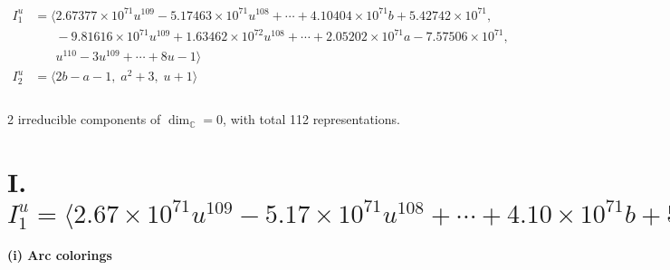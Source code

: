 \documentclass[1p]{elsarticle_modified}
\theoremstyle{definition}
\begin{document}
\begin{align*}
I^u_{1}&=\langle 
2.67377\times10^{71} u^{109}-5.17463\times10^{71} u^{108}+\cdots+4.10404\times10^{71} b+5.42742\times10^{71},\\
\phantom{I^u_{1}}&\phantom{= \langle  }-9.81616\times10^{71} u^{109}+1.63462\times10^{72} u^{108}+\cdots+2.05202\times10^{71} a-7.57506\times10^{71},\\
\phantom{I^u_{1}}&\phantom{= \langle  }u^{110}-3 u^{109}+\cdots+8 u-1\rangle \\
I^u_{2}&=\langle 
2 b- a-1,\;a^2+3,\;u+1\rangle \\
\\
\end{align*}
\raggedright * 2 irreducible components of $\dim_{\mathbb{C}}=0$, with total 112 representations.\\
\newpage
\renewcommand{\arraystretch}{1}
\centering \section*{I. $I^u_{1}= \langle 2.67\times10^{71} u^{109}-5.17\times10^{71} u^{108}+\cdots+4.10\times10^{71} b+5.43\times10^{71},\;-9.82\times10^{71} u^{109}+1.63\times10^{72} u^{108}+\cdots+2.05\times10^{71} a-7.58\times10^{71},\;u^{110}-3 u^{109}+\cdots+8 u-1 \rangle$}
\flushleft \textbf{(i) Arc colorings}\\
\end{document}
